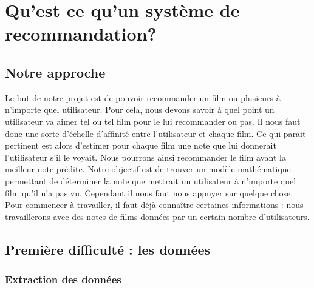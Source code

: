 \documentclass[a4paper,10pt]{article}
\title{}
\author{}
\begin{document}
\maketitle

\begin{abstract}
\end{abstract}

\section{Qu'est ce qu'un système de recommandation?}

\subsection{Notre approche}

Le but de notre projet est de pouvoir recommander un film ou plusieurs à n'importe quel utilisateur. 
Pour cela, nous devons savoir à quel point un utilisateur va aimer tel ou tel film pour le lui recommander ou pas. 
Il nous faut donc une sorte d'échelle d'affinité entre l'utilisateur et chaque film. Ce qui parait pertinent est alors d'estimer pour chaque film une note que lui donnerait l'utilisateur s'il le voyait.
Nous pourrons ainsi recommander le film ayant la meilleur note prédite.
Notre objectif est de trouver un modèle mathématique permettant de déterminer la note que mettrait un utilisateur à n'importe quel film qu'il n'a pas vu. 
Cependant il nous faut nous appuyer sur quelque chose. Pour commencer à travailler, il faut déjà connaître certaines informations : nous travaillerons avec des notes de films données par un certain nombre d'utilisateurs.

\subsection{Première difficulté : les données}
\subsubsection{Extraction des données}
\end{document}
